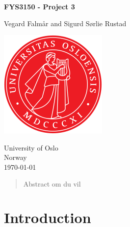 \documentclass[reprint, english,notitlepage,nofootinbib]{revtex4-1}  %
\begin{document}
\begin{titlepage}
	\begin{center}
	\textbf{FYS3150 - Project 3}

	\vspace{0.2cm}
	Vegard Falmår and Sigurd Sørlie Rustad
	
	\vspace{0.5cm}
	\includegraphics[scale=0.5]{UIO}
	\vspace{0.8cm}

	University of Oslo\\
	Norway\\
	\today	\\
	\end{center}
	\tableofcontents
	\clearpage
\end{titlepage}

\begin{abstract}
Abstract om du vil
\end{abstract}
\maketitle                              %


\section{Introduction}
\end{document}
